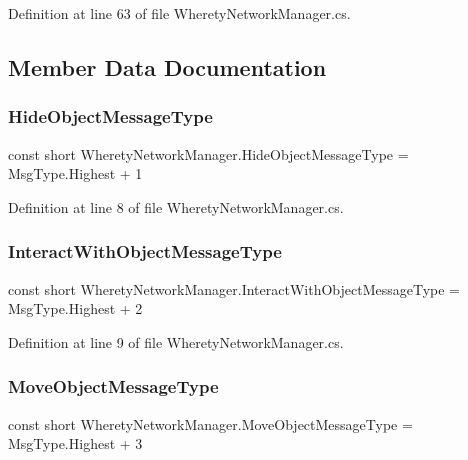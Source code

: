 Definition at line 63 of file Wherety\+Network\+Manager.\+cs.



\subsection{Member Data Documentation}
\mbox{\label{class_wherety_network_manager_aa5ec96c0e0a247df2a8deef2b48f5d37}} 
\subsubsection{\texorpdfstring{HideObjectMessageType}{HideObjectMessageType}}
{\footnotesize\ttfamily const short Wherety\+Network\+Manager.\+Hide\+Object\+Message\+Type = Msg\+Type.\+Highest + 1}



Definition at line 8 of file Wherety\+Network\+Manager.\+cs.

\mbox{\label{class_wherety_network_manager_afc167de4176e136df7e0ea9b148e0051}} 
\subsubsection{\texorpdfstring{InteractWithObjectMessageType}{InteractWithObjectMessageType}}
{\footnotesize\ttfamily const short Wherety\+Network\+Manager.\+Interact\+With\+Object\+Message\+Type = Msg\+Type.\+Highest + 2}



Definition at line 9 of file Wherety\+Network\+Manager.\+cs.

\mbox{\label{class_wherety_network_manager_a6d27960bd46c2086472904588aa41dd3}} 
\subsubsection{\texorpdfstring{MoveObjectMessageType}{MoveObjectMessageType}}
{\footnotesize\ttfamily const short Wherety\+Network\+Manager.\+Move\+Object\+Message\+Type = Msg\+Type.\+Highest + 3}



